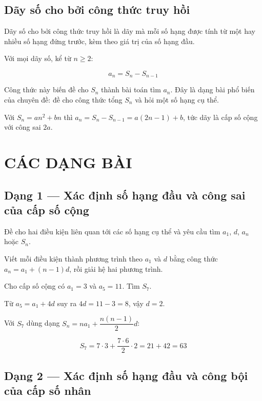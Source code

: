 \documentclass[11pt, a4paper]{article}
\begin{document}
\subsection{Dãy số cho bởi công thức truy hồi}

\begin{dinhnghia}
Dãy số cho bởi công thức truy hồi là dãy mà mỗi số hạng được tính từ một hay nhiều số hạng đứng trước, kèm theo giá trị của số hạng đầu.
\end{dinhnghia}
\begin{dinhly}
Với mọi dãy số, kể từ $n \ge 2$:

$$a_n = S_n - S_{n-1}$$

 Công thức này biến đề cho $S_n$ thành bài toán tìm $a_n$. Đây là dạng bài phổ biến của chuyên đề: đề cho công thức tổng $S_n$ và hỏi một số hạng cụ thể.

 Với $S_n = an^2 + bn$ thì $a_n = S_n - S_{n-1} = a(2n - 1) + b$, tức dãy là cấp số cộng với công sai $2a$.

\end{dinhly}
\section{CÁC DẠNG BÀI}

\subsection{Dạng 1 — Xác định số hạng đầu và công sai của cấp số cộng}

 Đề cho hai điều kiện liên quan tới các số hạng cụ thể và yêu cầu tìm $a_1$, $d$, $a_n$ hoặc $S_n$.

 Viết mỗi điều kiện thành phương trình theo $a_1$ và $d$ bằng công thức $a_n = a_1 + (n-1)d$, rồi giải hệ hai phương trình.

\begin{vidu}[{1}]
Cho cấp số cộng có $a_1 = 3$ và $a_5 = 11$. Tìm $S_7$.

Từ $a_5 = a_1 + 4d$ suy ra $4d = 11 - 3 = 8$, vậy $d = 2$.

Với $S_7$ dùng dạng $S_n = na_1 + \dfrac{n(n-1)}{2}d$:

$$S_7 = 7 \cdot 3 + \frac{7 \cdot 6}{2} \cdot 2 = 21 + 42 = 63$$

\end{vidu}
\subsection{Dạng 2 — Xác định số hạng đầu và công bội của cấp số nhân}
\end{document}
